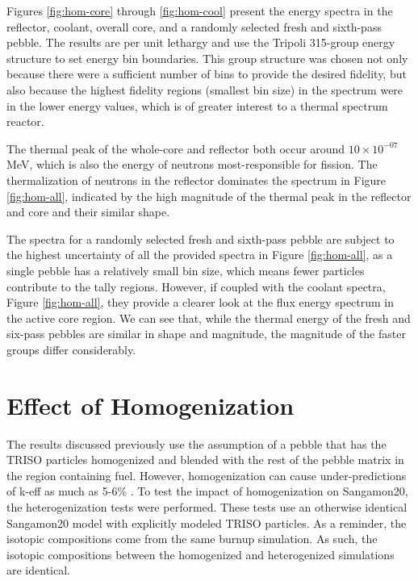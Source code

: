 Figures \ref{fig:hom-core} through \ref{fig:hom-cool} present the energy spectra in the reflector, coolant, overall core, and a randomly selected fresh and sixth-pass pebble.  The results are per unit lethargy and use the Tripoli 315-group energy structure \cite{noauthor_tripoli_nodate} to set energy bin boundaries.  This group structure was chosen not only because there were a sufficient number of bins to provide the desired fidelity, but also because the highest fidelity regions (smallest bin size) in the spectrum were in the lower energy values, which is of greater interest to a thermal spectrum reactor.



The thermal peak of the whole-core and reflector both occur around $10\times10^{-07}$ MeV, which is also the energy of neutrons most-responsible for fission.  The thermalization of neutrons in the reflector dominates the spectrum in Figure \ref{fig:hom-all}, indicated by the high magnitude of the thermal peak in the reflector and core and their similar shape.

%

The spectra for a randomly selected fresh and sixth-pass pebble are subject to the highest uncertainty of all the provided spectra in Figure \ref{fig:hom-all}, as a single pebble has a relatively small bin size, which means fewer particles contribute to the tally regions.  However, if coupled with the coolant spectra, Figure \ref{fig:hom-all}, they provide a clearer look at the flux energy spectrum in the active core region.  We can see that, while the thermal energy of the fresh and six-pass pebbles are similar in shape and magnitude, the magnitude of the faster groups differ considerably.


\section{Effect of Homogenization}
\label{res-hom}

The results discussed previously use the assumption of a pebble that has the TRISO particles homogenized and blended with the rest of the pebble matrix in the region containing fuel.  However, homogenization can cause under-predictions of k-eff as much as 5-6\% \cite{brown_stochastic_2005}.  To test the impact of homogenization on Sangamon20, the heterogenization tests were performed.  These tests use an otherwise identical Sangamon20 model with explicitly modeled TRISO particles.  As a reminder, the isotopic compositions come from the same burnup simulation.  As such, the isotopic compositions between the homogenized and heterogenized simulations are identical.


